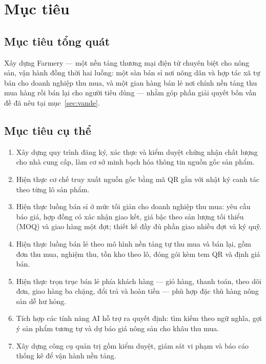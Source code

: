 \section{Mục tiêu}
\label{sec:muctieu}

\subsection{Mục tiêu tổng quát}

Xây dựng Farmery --- một nền tảng thương mại điện tử chuyên biệt cho nông sản, vận hành đồng thời hai luồng: một sàn bán sỉ nơi nông dân và hợp tác xã tự bán cho doanh nghiệp thu mua, và một gian hàng bán lẻ nơi chính nền tảng thu mua hàng rồi bán lại cho người tiêu dùng --- nhằm góp phần giải quyết bốn vấn đề đã nêu tại mục~\ref{sec:vande}.

\subsection{Mục tiêu cụ thể}

\begin{enumerate}
    \item[\textbf{MT1.}] Xây dựng quy trình đăng ký, xác thực và kiểm duyệt chứng nhận chất lượng cho nhà cung cấp, làm cơ sở minh bạch hóa thông tin nguồn gốc sản phẩm.
    \item[\textbf{MT2.}] Hiện thực cơ chế truy xuất nguồn gốc bằng mã QR gắn với nhật ký canh tác theo từng lô sản phẩm.
    \item[\textbf{MT3.}] Hiện thực luồng bán sỉ ở mức tối giản cho doanh nghiệp thu mua: yêu cầu báo giá, hợp đồng có xác nhận giao kết, giá bậc theo sản lượng tối thiểu (MOQ) và giao hàng một đợt; thiết kế đầy đủ phần giao nhiều đợt và ký quỹ.
    \item[\textbf{MT4.}] Hiện thực luồng bán lẻ theo mô hình nền tảng tự thu mua và bán lại, gồm đơn thu mua, nghiệm thu, tồn kho theo lô, đóng gói kèm tem QR và định giá bán.
    \item[\textbf{MT5.}] Hiện thực trọn trục bán lẻ phía khách hàng --- giỏ hàng, thanh toán, theo dõi đơn, giao hàng ba chặng, đổi trả và hoàn tiền --- phù hợp đặc thù hàng nông sản dễ hư hỏng.
    \item[\textbf{MT6.}] Tích hợp các tính năng AI hỗ trợ ra quyết định: tìm kiếm theo ngữ nghĩa, gợi ý sản phẩm tương tự và dự báo giá nông sản cho khâu thu mua.
    \item[\textbf{MT7.}] Xây dựng công cụ quản trị gồm kiểm duyệt, giám sát vi phạm và báo cáo thống kê để vận hành nền tảng.
\end{enumerate}


